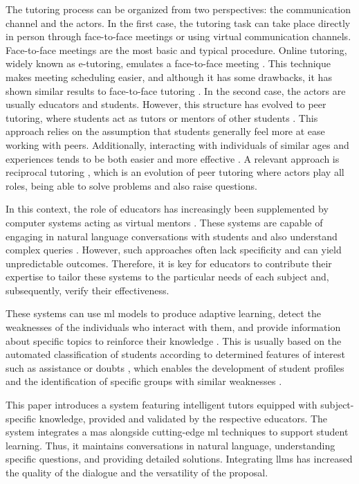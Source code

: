 \documentclass[pdflatex,sn-mathphys-num]{sn-jnl}%
\begin{document}
The tutoring process can be organized from two perspectives: the communication channel and the actors. In the first case, the tutoring task can take place directly in person through face-to-face meetings or using virtual communication channels. Face-to-face meetings are the most basic and typical procedure. Online tutoring, widely known as e-tutoring, emulates a face-to-face meeting \cite{kraft2022online}. This technique makes meeting scheduling easier, and although it has some drawbacks, it has shown similar results to face-to-face tutoring \cite{mare2021effectiveness}. In the second case, the actors are usually educators and students. However, this structure has evolved to peer tutoring, where students act as tutors or mentors of other students \cite{fernandez2023peer}. This approach relies on the assumption that students generally feel more at ease working with peers. Additionally, interacting with individuals of similar ages and experiences tends to be both easier and more effective \cite{thurston2020influence}. A relevant approach is reciprocal tutoring \cite{alemu2020improving}, which is an evolution of peer tutoring where actors play all roles, being able to solve problems and also raise questions.

In this context, the role of educators has increasingly been supplemented by computer systems acting as virtual mentors \cite{zhou1999practical}. These systems are capable of engaging in natural language conversations with students \cite{paladines2020systematic} and also understand complex queries \cite{rathore2020intelligent}. However, such approaches often lack specificity and can yield unpredictable outcomes. Therefore, it is key for educators to contribute their expertise to tailor these systems to the particular needs of each subject and, subsequently, verify their effectiveness.

These systems can use \ac{ml} models to produce adaptive learning, detect the weaknesses of the individuals who interact with them, and provide information about specific topics to reinforce their knowledge \cite{katz2021linking}. This is usually based on the automated classification of students according to determined features of interest such as assistance or doubts \cite{vsaric2023student}, which enables the development of student profiles and the identification of specific groups with similar weaknesses \cite{alshaikh2021ai}.

This paper introduces a system featuring intelligent tutors equipped with subject-specific knowledge, provided and validated  by the respective educators. The system integrates a \ac{mas} alongside cutting-edge \ac{ml} techniques to support student learning. Thus, it maintains conversations in natural language, understanding specific questions, and providing detailed solutions. Integrating \acp{llm} has increased the quality of the dialogue and the versatility of the proposal.
\end{document}
